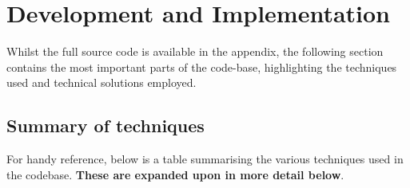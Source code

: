 \section{Development and Implementation}

Whilst the full source code is available in the appendix, the following section contains the most important parts of the code-base, highlighting the techniques used and technical solutions employed.

\subsection{Summary of techniques}
For handy reference, below is a table summarising the various techniques used in the codebase. \textbf{These are expanded upon in more detail below}.

